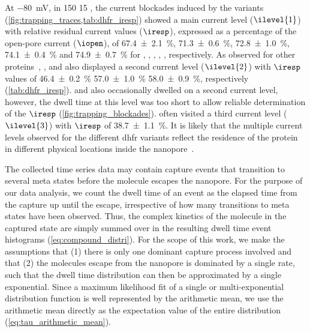 At \SI{-80}{\mV}, in \SI{150}{\mM}  \SI{15}{\mM}  , the current blockades
induced by the  variants (\cref{fig:trapping_traces,tab:dhfr_iresp}) showed a main current level
($\ilevel{1}$) with relative residual current values ($\iresp$), expressed as a percentage of the open-pore
current ($\iopen$), of \SI{67.4 \pm 2.1}{\percent}, \SI{71.3 \pm 0.6}{\percent}, \SI{72.8 \pm 1.0}{\percent},
\SI{74.1 \pm 0.4}{\percent} and \SI{74.9 \pm 0.7}{\percent} for , , ,
, , respectively. As observed for other proteins~\cite{Soskine-2012,Soskine-2013,
Soskine-Biesemans-2015,Biesemans-2015}, ,  and  also displayed a second
current level ($\ilevel{2}$) with $\iresp$ values of \SI{46.4 \pm 0.2}{\percent} \SI{57.0 \pm 1.0}{\percent}
\SI{58.0 \pm 0.9}{\percent}, respectively (\cref{tab:dhfr_iresp}).  and  also
occasionally dwelled on a second current level, however, the dwell time at this level was too short to allow
reliable determination of the $\iresp$ (\cref{fig:trapping_blockades}).  often visited a third
current level ($\ilevel{3}$) with $\iresp$ of \SI{38.7\pm 1.1}{\percent}. It is likely that the multiple
current levels observed for the different \gls{dhfr} variants reflect the residence of the protein in
different physical locations inside the nanopore~\cite{Soskine-2012}.

The collected time series data may contain capture events that transition to several meta states before the
molecule escapes the nanopore. For the purpose of our data analysis, we count the dwell time of an event as
the elapsed time from the capture up until the escape, irrespective of how many transitions to meta states
have been observed. Thus, the complex kinetics of the molecule in the captured state are simply summed over in
the resulting dwell time event histograms (\cref{eq:compound_distri}). For the scope of this work, we make the
assumptions that (1) there is only one dominant capture process involved and that (2) the molecules escape
from the nanopore is dominated by a single rate, such that the dwell time distribution can then be
approximated by a single exponential. Since a maximum likelihood fit of a single or multi-exponential
distribution function is well represented by the arithmetic mean, we use the arithmetic mean directly as the
expectation value of the entire distribution (\cref{eq:tau_arithmetic_mean}).



